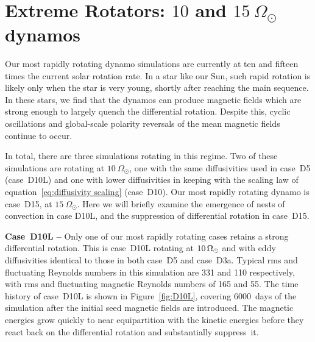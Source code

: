 \section{Extreme Rotators: $10$ and $15~\Omega_\odot$ dynamos}

Our most rapidly rotating dynamo simulations are currently at ten and
fifteen times the current solar rotation rate.  In a star like our
Sun, such rapid rotation is likely only when the star is very young,
shortly after reaching the main sequence.  In these stars, we find that
the dynamos can produce magnetic fields which are strong enough to
largely quench the differential rotation.  Despite this, cyclic
oscillations and global-scale polarity reversals of the mean magnetic
fields continue to occur.  

In total, there are three simulations rotating in this regime.  Two of
these simulations are rotating at $10~\Omega_\odot$, one with the same
diffusivities used in case~D5 (case~D10L) and one with lower
diffusivities in keeping with the scaling law of
equation~\ref{eq:diffusivity scaling} (case~D10).  Our most rapidly
rotating dynamo is case~D15, at $15~\Omega_\odot$.  Here we will
briefly examine the emergence of nests of convection in case D10L, and
the suppression of differential rotation in case~D15.


\textbf{Case~D10L --} 
Only one of our most rapidly rotating cases retains a strong
differential rotation.  This is case~D10L rotating at
$10\thinspace\Omega_\odot$ and with eddy diffusivities identical to
those in both case~D5 and case~D3a.  Typical rms and fluctuating
Reynolds numbers in this simulation are 331 and 110 respectively, with
rms and fluctuating magnetic Reynolds numbers of 165 and 55.  The time
history of case~D10L is shown in Figure~\ref{fig:D10L}, covering
6000~days of the simulation after the initial seed magnetic fields are
introduced.  The magnetic energies grow quickly to near equipartition
with the kinetic energies before they react back on the differential
rotation and substantially suppress~it.  

